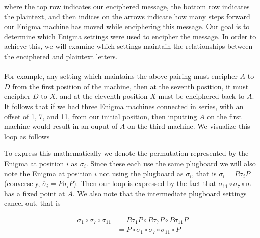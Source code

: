     where the top row indicates our enciphered message, the bottom row indicates the plaintext,
    and then indices on the arrows indicate how many steps forward our Enigma machine has moved while enciphering this message.
    Our goal is to determine which Enigma settings were used to encipher the message.  In order to achieve this, 
    we will examine which settings maintain the relationships between the enciphered and plaintext letters. 
    \\\\For example, any setting which maintains the above pairing must encipher $A$ to $D$ from the first position of the machine, then at 
    the seventh position, it must encipher $D$ to $X$, and at the eleventh position $X$ must be enciphered back to $A$. It follows that if we had 
    three Enigma machines connected in series, with an offset of 1, 7, and 11, from our initial position, then inputting $A$ on the first machine would result in an ouput of $A$ on the
    third machine. We visualize this loop as follows 
    \begin{center}
    \end{center}
    To express this mathematically we denote the permutation represented by the Enigma at 
    position $i$ as $\sigma_i$. Since these each use the same plugboard we will also note the 
    Enigma at position $i$ not using the plugboard as $\overline{\sigma_i}$, that is $\sigma_i = P\overline{\sigma_i}P$ (conversely, $\overline\sigma_i = P\sigma_iP$).
    Then our loop is expressed by the fact that $\sigma_{11}\circ\sigma_7\circ\sigma_1$ has a fixed point at $A$. 
    We also note that the intermediate plugboard settings cancel out, that is 
    \begin{center}
        \begin{align*}
            \sigma_{1}\circ\sigma_7\circ\sigma_{11} &= P\overline{\sigma_{1}}P\circ P\overline{\sigma_7}P\circ P\overline{\sigma_{11}}P
            \\&= P\circ \overline{\sigma_{1}}\circ\overline{\sigma_7}\circ\overline{\sigma_{11}}\circ P 
        \end{align*}
    \end{center}
